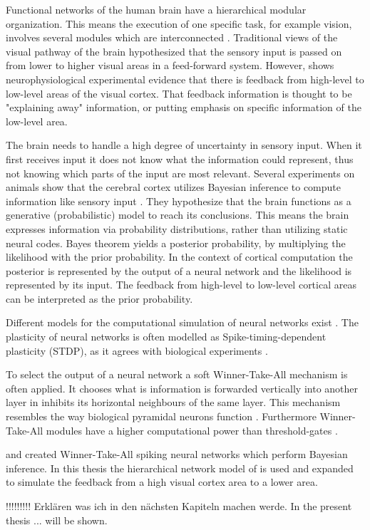 Functional networks of the human brain have a hierarchical modular organization. This means the execution of one specific task, for example vision, involves several modules which are interconnected  \citep{hierarchicalBrain}. Traditional views of the visual pathway of the brain hypothesized that the sensory input is passed on from lower to higher visual areas in a feed-forward system. However, \citet{HierachicalBayesVisualCortex} shows  neurophysiological experimental evidence that there is feedback from high-level to low-level areas of the visual cortex. That feedback information is thought to be "explaining away" information, or putting emphasis on specific information of the low-level area. 
 
The brain needs to handle a high degree of uncertainty in sensory input. When it first receives input it does not know what the information could represent, thus not knowing which parts of the input are most relevant. Several experiments on animals show that the cerebral cortex utilizes Bayesian inference to compute information like sensory input \citep{neuralSubstrate, HierachicalBayesVisualCortex, anatomyOfInference}. They hypothesize that the brain functions as a generative (probabilistic) model to reach its conclusions. This means the brain expresses information via probability distributions, rather than utilizing static neural codes. Bayes theorem yields a posterior probability, by multiplying the likelihood with the prior probability. In the context of cortical computation the posterior is represented by the output of a neural network and the likelihood is represented by its input. The feedback from high-level to low-level cortical areas can be interpreted as the prior probability.

Different models for the computational simulation of neural networks exist  \citep{SpikingNeuronModelsBook}. The plasticity of neural networks is often modelled as Spike-timing-dependent plasticity (STDP), as it agrees with biological experiments \citep{STDPFELDMAN, STDPDAN}. 

To select the output of a neural network a soft Winner-Take-All mechanism is often applied. It chooses what is information is forwarded vertically into another layer in inhibits its horizontal neighbours of the same layer.  This mechanism resembles the way biological pyramidal neurons function \citep{softWTA}. Furthermore Winner-Take-All modules have a higher computational power than threshold-gates \citep{WTAPower}.

\citet{nessler} and \citet{nesslerClone} created Winner-Take-All spiking neural networks which perform Bayesian inference. In this thesis the hierarchical network model of \citet{nessler} is used and expanded  to simulate the feedback from a high visual cortex area to a lower area.

!!!!!!!!! Erklären was ich in den nächsten Kapiteln machen werde.
In the present thesis ... will be shown.